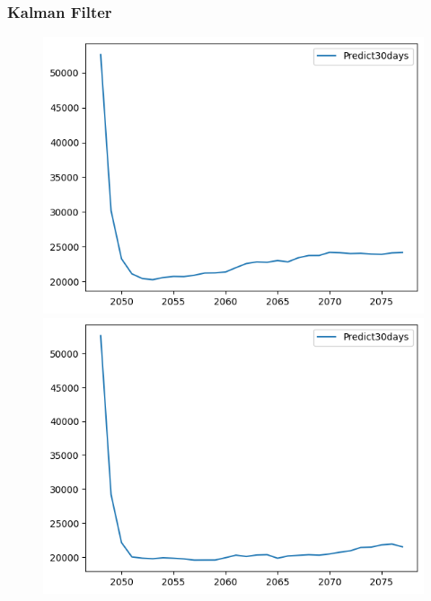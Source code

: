 \subsubsection{Kalman Filter}
\begin{figure}[H]
    \centering
    \begin{minipage}{0.15\textwidth}
    \centering
    \includegraphics[width=1\textwidth]{resources/chapter-5/predicted/KF_BIDV_7_3_30days.png}
    \end{minipage}
    \hfill
    \begin{minipage}{0.15\textwidth}
    \centering
    \includegraphics[width=1\textwidth]{resources/chapter-5/predicted/KF_BIDV_8_2_30days.png}
    \end{minipage}
    \hfill
        \begin{minipage}{0.15\textwidth}

\end{minipage}
\end{figure}
